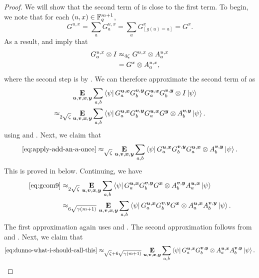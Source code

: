 \begin{proof}
We will show that the second term of  is close to the first term.
To begin, we note that for each $(u, x) \in \mathbb F_q^{m+1}$,
\begin{equation}\label{eq:sum-of-gux}
G^{u, x} = \sum_a G^{u, x}_a =  \sum_a G^{x}_{[g(u) = a]} = G^x.
\end{equation}
As a result, 
  and  imply that
\begin{align}
G^{u,x}_a \otimes I 
&\approx_{4\zeta} G^{u, x} \otimes A^{u, x}_a \nonumber\\
&= G^{x} \otimes A^{u, x}_a, \label{eq:add-an-a}
\end{align}
where the second step is by .
We can therefore approximate the second term of 
as
\begin{align}
&\mathop{\bf E\/}_{\boldsymbol{u},\boldsymbol{v},{\boldsymbol{x}},\boldsymbol{y}} \sum_{a,b} \bra{\psi} G^{\boldsymbol{u},{\boldsymbol{x}}}_a  G^{\boldsymbol{v},\boldsymbol{y}}_b G^{\boldsymbol{u},{\boldsymbol{x}}}_a G^{\boldsymbol{v},\boldsymbol{y}}_b  \otimes I \ket{\psi} \nonumber\\
\approx_{2\sqrt{\zeta}}& \mathop{\bf E\/}_{\boldsymbol{u},\boldsymbol{v},{\boldsymbol{x}},\boldsymbol{y}} \sum_{a,b} \bra{\psi} G^{\boldsymbol{u},{\boldsymbol{x}}}_a  G^{\boldsymbol{v},\boldsymbol{y}}_b G^{\boldsymbol{u},{\boldsymbol{x}}}_a G^{\boldsymbol{y}}  \otimes A^{\boldsymbol{v},\boldsymbol{y}}_b \ket{\psi}.\label{eq:apply-add-an-a-once}
\end{align}
using  and .
Next, we claim that
\begin{equation}
\eqref{eq:apply-add-an-a-once}
\approx_{\sqrt{\zeta}}\mathop{\bf E\/}_{\boldsymbol{u},\boldsymbol{v},{\boldsymbol{x}},\boldsymbol{y}} \sum_{a,b} \bra{\psi} G^{\boldsymbol{u},{\boldsymbol{x}}}_a  G^{\boldsymbol{v},\boldsymbol{y}}_b G^{\boldsymbol{u},{\boldsymbol{x}}}_a  \otimes A^{\boldsymbol{v},\boldsymbol{y}}_b \ket{\psi}. \label{eq:gcom9} 
\end{equation}
This is proved in  below. Continuing, we have
\begin{align}
\eqref{eq:gcom9} &\approx_{2\sqrt{\zeta}} \mathop{\bf E\/}_{\boldsymbol{u},\boldsymbol{v},{\boldsymbol{x}},\boldsymbol{y}} \sum_{a,b} \bra{\psi} G^{\boldsymbol{u},{\boldsymbol{x}}}_a  G^{\boldsymbol{v},\boldsymbol{y}}_b G^{{\boldsymbol{x}}}  \otimes A^{\boldsymbol{v},\boldsymbol{y}}_b A^{\boldsymbol{u},{\boldsymbol{x}}}_a \ket{\psi} \nonumber\\
&\approx_{6\sqrt{\gamma (m+1)}} \mathop{\bf E\/}_{\boldsymbol{u},\boldsymbol{v},{\boldsymbol{x}},\boldsymbol{y}} \sum_{a,b} \bra{\psi} G^{\boldsymbol{u},{\boldsymbol{x}}}_a  G^{\boldsymbol{v},\boldsymbol{y}}_b  G^{{\boldsymbol{x}}}  \otimes A^{\boldsymbol{u},{\boldsymbol{x}}}_a A^{\boldsymbol{v},\boldsymbol{y}}_b \ket{\psi}. \label{eq:dunno-what-i-should-call-this}
\end{align}
The first approximation again uses   and . The second approximation follows from   and .
Next, we claim that
\begin{equation}
\eqref{eq:dunno-what-i-should-call-this}
\approx_{\sqrt{\zeta}+6\sqrt{\gamma(m+1)}} \E_{\bu,\bv,\bx,\by} \sum_{a,b} \bra{\psi} G^{\bu, \bx}_a  G^{\bv,\by}_b \ot A^{\bu,\bx}_a  A^{\bv,\by}_b \ket{\psi}.

\end{equation}
\end{proof}
